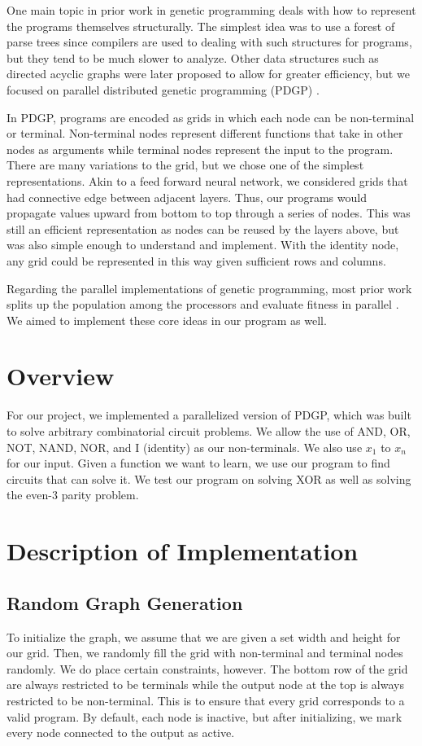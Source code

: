 \documentclass[12pt,conference]{IEEEtran}
\begin{document}
	One main topic in prior work in genetic programming deals with how to represent the programs themselves structurally. The simplest idea was to use a forest of parse trees since compilers are used to dealing with such structures for programs, but they tend to be much slower to analyze. Other data structures such as directed acyclic graphs \cite{b2} were later proposed to allow for greater efficiency, but we focused on parallel distributed genetic programming (PDGP) \cite{b3}. 
	
	In PDGP, programs are encoded as grids in which each node can be non-terminal or terminal. Non-terminal nodes represent different functions that take in other nodes as arguments while terminal nodes represent the input to the program. There are many variations to the grid, but we chose one of the simplest representations. Akin to a feed forward neural network, we considered grids that had connective edge between adjacent layers. Thus, our programs would propagate values upward from bottom to top through a series of nodes. This was still an efficient representation as nodes can be reused by the layers above, but was also simple enough to understand and implement. With the identity node, any grid could be represented in this way given sufficient rows and columns.
	
	Regarding the parallel implementations of genetic programming, most prior work splits up the population among the processors and evaluate fitness in parallel \cite{b4}. We aimed to implement these core ideas in our program as well.
	
	
	\section{Overview}
	For our project, we implemented a parallelized version of PDGP, which was built to solve arbitrary combinatorial circuit problems. We allow the use of AND, OR, NOT, NAND, NOR, and I (identity) as our non-terminals. We also use $x_1$ to $x_n$ for our input. Given a function we want to learn, we use our program to find circuits that can solve it. We test our program on solving XOR as well as solving the even-3 parity problem. 
	
	\section{Description of Implementation}

	\subsection{Random Graph Generation}
	To initialize the graph, we assume that we are given a set width and height for our grid. Then, we randomly fill the grid with non-terminal and terminal nodes randomly. We do place certain constraints, however. The bottom row of the grid are always restricted to be terminals while the output node at the top is always restricted to be non-terminal. This is to ensure that every grid corresponds to a valid program. By default, each node is inactive, but after initializing, we mark every node connected to the output as active. 
	
\end{document}
